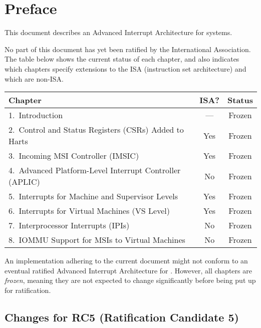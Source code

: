 
\chapter{Preface}

This document describes an Advanced Interrupt Architecture
for {\RISCV} systems.

No part of this document has yet been ratified
by the {\RISCV} International Association.
The table below shows the current status of each chapter,
and also indicates which chapters specify extensions to the
{\RISCV} ISA (instruction set architecture) and which are non-ISA.

{
\begin{table}[hbt]
\centering
\begin{tabular}{|l|c|c|}
\hline
Chapter                                                  & ISA? & Status \\
\hline
\hline
1.\ Introduction                                         & ---  & Frozen \\
2.\ Control and Status Registers (CSRs) Added to Harts   & Yes  & Frozen \\
3.\ Incoming MSI Controller (IMSIC)                      & Yes  & Frozen \\
4.\ Advanced Platform-Level Interrupt Controller (APLIC) & No   & Frozen \\
5.\ Interrupts for Machine and Supervisor Levels         & Yes  & Frozen \\
6.\ Interrupts for Virtual Machines (VS Level)           & Yes  & Frozen \\
7.\ Interprocessor Interrupts (IPIs)                     & No   & Frozen \\
8.\ IOMMU Support for MSIs to Virtual Machines           & No   & Frozen \\
\hline
\end{tabular}
\end{table}
}

An implementation adhering to the current document might not conform
to an eventual ratified Advanced Interrupt Architecture for {\RISCV}.
However, all chapters are \emph{frozen}, meaning they are not expected
to change significantly before being put up for ratification.

\section*{Changes for RC5 (Ratification Candidate 5)}


